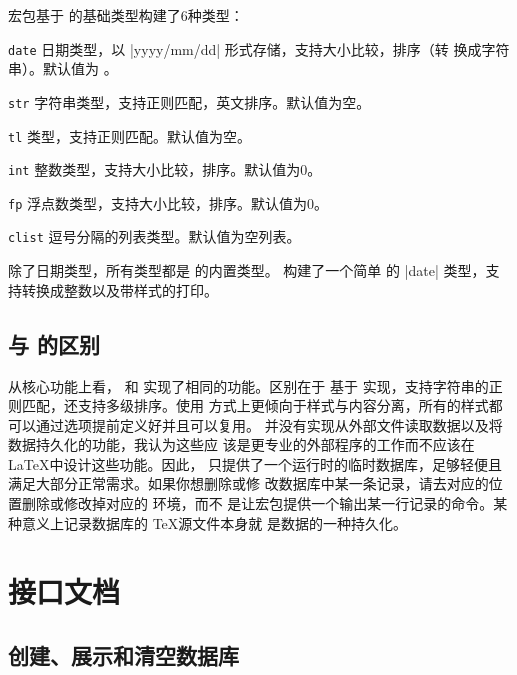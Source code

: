 \documentclass[full]{l3doc}
\begin{document}
\begin{documentation}
宏包基于  的基础类型构建了6种类型：
\begin{Description}
  \item[\texttt{date}]
    日期类型，以 |yyyy/mm/dd| 形式存储，支持大小比较，排序（转
    换成字符串）。默认值为 。
  \item[\texttt{str}]
    字符串类型，支持正则匹配，英文排序。默认值为空。
  \item[\texttt{tl}]
    类型，支持正则匹配。默认值为空。
  \item[\texttt{int}]
    整数类型，支持大小比较，排序。默认值为0。
  \item[\texttt{fp}]
    浮点数类型，支持大小比较，排序。默认值为0。
  \item[\texttt{clist}]
    逗号分隔的列表类型。默认值为空列表。
\end{Description}

除了日期类型，所有类型都是  的内置类型。 构建了一个简单
的 |date| 类型，支持转换成整数以及带样式的打印。

\subsection{与  的区别}


从核心功能上看， 和  实现了相同的功能。区别在于
 基于  实现，支持字符串的正则匹配，还支持多级排序。使用
方式上更倾向于样式与内容分离，所有的样式都可以通过选项提前定义好并且可以复用。
 并没有实现从外部文件读取数据以及将数据持久化的功能，我认为这些应
该是更专业的外部程序的工作而不应该在 \LaTeX 中设计这些功能。因此，
只提供了一个运行时的临时数据库，足够轻便且满足大部分正常需求。如果你想删除或修
改数据库中某一条记录，请去对应的位置删除或修改掉对应的  环境，而不
是让宏包提供一个输出某一行记录的命令。某种意义上记录数据库的 \TeX 源文件本身就
是数据的一种持久化。

\section{接口文档}

\subsection{创建、展示和清空数据库}


\end{documentation}
\end{document}
